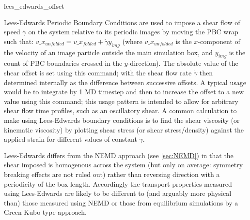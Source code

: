 \begin{essyntax}
   lees_edwards_offset   
  \begin{features}
  \end{features}

\end{essyntax}

Lees-Edwards Periodic Boundary Conditions are used to impose a shear flow of speed $\dot{\gamma}$ on the system relative to its periodic images by moving the PBC wrap such that:  $v\_x_{unfolded} =  v\_x_{folded} + \dot{\gamma} y_{img}$ (where $v\_x_{unfolded}$ is the $x$-component of the velocity of an image particle outside the main simulation box, and $y_{img}$ is the count of PBC boundaries crossed in the $y$-direction).  
The absolute value of the shear offset is set using this command; with the shear flow rate $\dot{\gamma}$ then determined internally as the difference between successive offsets.  
A typical usage would be to integrate by 1 {MD} timestep and then to increase the offset to a new value using this command; this usage pattern is intended to allow for arbitrary shear flow time profiles, such as an oscillatory shear.  
A common calculation to make using Lees-Edwards boundary conditions is to find the shear viscosity (or kinematic viscosity) by plotting shear stress (or shear stress/density) against the applied strain for different values of constant $\dot{\gamma}$. 

Lees-Edwards differs from the NEMD approach (see \vref{sec:NEMD}) in that the shear imposed is homogenous across the system (but only on average: symmetry breaking effects are not ruled out) rather than reversing direction with a periodicity of the box length. 
Accordingly the transport properties  measured using Lees-Edwards are likely to be different to (and arguably more physical than) those measured using NEMD or those from equilibrium simulations by a Green-Kubo type approach.

